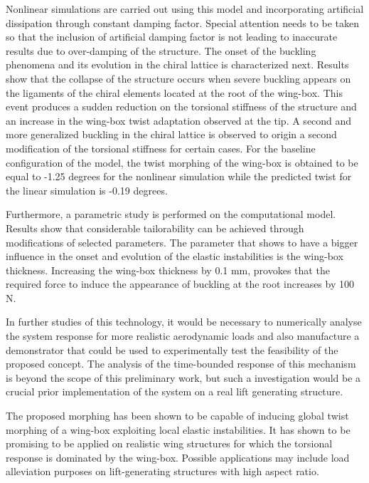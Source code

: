 Nonlinear simulations are carried out using this model and incorporating artificial dissipation through constant damping factor. Special attention needs to be taken so that the inclusion of artificial damping factor is not leading to inaccurate results due to over-damping of the structure. The onset of the buckling phenomena and its evolution in the chiral lattice is characterized next. Results show that the collapse of the structure occurs when severe buckling appears on the ligaments of the chiral elements located at the root of the wing-box. This event produces a sudden reduction on the torsional stiffness of the structure and an increase in the wing-box twist adaptation observed at the tip. A second and more generalized buckling in the chiral lattice is observed to origin a second modification of the torsional stiffness for certain cases. For the baseline configuration of the model, the twist morphing of the wing-box is obtained to be equal to -1.25 degrees for the nonlinear simulation while the predicted twist for the linear simulation is -0.19 degrees.

Furthermore, a parametric study is performed on the computational model. Results show that considerable tailorability can be achieved through modifications of selected parameters. The parameter that shows to have a bigger influence in the onset and evolution of the elastic instabilities is the wing-box thickness. Increasing the wing-box thickness by 0.1 mm, provokes that the required force to induce the appearance of buckling at the root increases by 100 N. 

In further studies of this technology, it would be necessary to numerically analyse the system response for more realistic aerodynamic loads and also manufacture a demonstrator that could be used to experimentally test the feasibility of the proposed concept. The analysis of the time-bounded response of this mechanism is beyond the scope of this preliminary work, but such a investigation would be a crucial prior implementation of the system on a real lift generating structure.

The proposed morphing has been shown to be capable of inducing global twist morphing of a wing-box exploiting local elastic instabilities. It has shown to be promising to be applied on realistic wing structures for which the torsional response is dominated by the wing-box. Possible applications may include load alleviation purposes on lift-generating structures with high aspect ratio. 